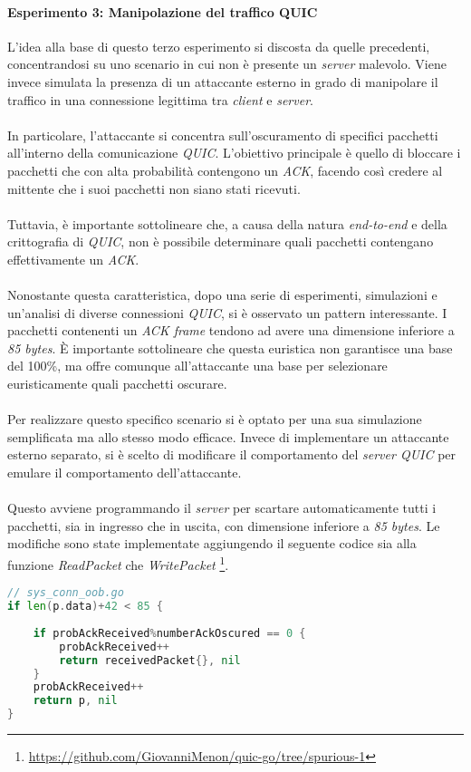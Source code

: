 \paragraph{Esperimento 3: Manipolazione del traffico QUIC }
\noindent L'idea alla base di questo terzo esperimento si discosta da quelle precedenti, concentrandosi su uno scenario in cui non è presente un \emph{server} malevolo.
Viene invece simulata la presenza di un attaccante esterno in grado di manipolare il traffico in una connessione legittima tra \emph{client} e \emph{server}.
\\\\
In particolare, l'attaccante si concentra sull'oscuramento di specifici pacchetti all'interno della comunicazione \emph{QUIC}. 
L'obiettivo principale è quello di bloccare i pacchetti che con alta probabilità contengono un \emph{ACK}, facendo così credere al mittente che i suoi pacchetti non siano stati ricevuti.
\\\\
Tuttavia, è importante sottolineare che, a causa della natura \emph{end-to-end} e della crittografia di \emph{QUIC}, non è possibile determinare quali pacchetti contengano effettivamente un \emph{ACK}.
\\\\
Nonostante questa caratteristica, dopo una serie di esperimenti, simulazioni e un'analisi di diverse connessioni \emph{QUIC}, si è osservato un pattern interessante. I pacchetti contenenti un \emph{ACK frame} tendono ad avere una dimensione inferiore a \emph{85 bytes}.
È importante sottolineare che questa euristica non garantisce una base del 100\%, ma offre comunque all'attaccante una base per selezionare euristicamente quali pacchetti oscurare.
\\\\
Per realizzare questo specifico scenario si è optato per una sua simulazione semplificata ma allo stesso modo efficace. 
Invece di implementare un attaccante esterno separato, si è scelto di modificare il comportamento del \emph{server QUIC} per emulare il comportamento dell'attaccante.
\\\\
Questo avviene programmando il \emph{server} per scartare automaticamente tutti i pacchetti, sia in ingresso che in uscita, con dimensione inferiore a \emph{85 bytes}.
Le modifiche sono state implementate aggiungendo il seguente codice sia alla funzione \emph{ReadPacket} che \emph{WritePacket} \footnote{\url{https://github.com/GiovanniMenon/quic-go/tree/spurious-1}}.
\begin{lstlisting}[language=Go]
// sys_conn_oob.go
if len(p.data)+42 < 85 {
	
	if probAckReceived%numberAckOscured == 0 {
		probAckReceived++
		return receivedPacket{}, nil
	}
	probAckReceived++
	return p, nil
}
\end{lstlisting}
